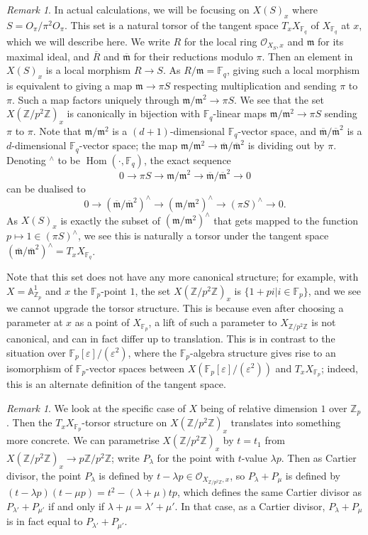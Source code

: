 \documentclass[12pt]{article}
\newcommand{\A}{\mathbb{A}}
\newcommand{\Z}{\mathbb{Z}}
\renewcommand{\O}{\mathcal{O}}
\newcommand{\F}{\mathbb{F}}
\newcommand{\m}{\mathfrak{m}}
\DeclareMathOperator{\Hom}{Hom}
\theoremstyle{plain}
\theoremstyle{definition}
\theoremstyle{remark}
\newtheorem{rem}[thm]{Remark} %
\begin{document}
\begin{rem}
\label{rem:torsortangentspace}
In actual calculations, we will be focusing on $X(S)_x$ where $S = O_\pi/\pi^2 O_\pi$. This set is a natural torsor of the tangent space $T_x X_{\F_q}$ of $X_{\F_q}$ at $x$, which we will describe here. We write $R$ for the local ring $\O_{X_{S},x}$ and $\m$ for its maximal ideal, and $\overline{R}$ and $\overline{\m}$ for their reductions modulo $\pi$. Then an element in $X(S)_x$ is a local morphism $R \to S$. As $R/\m = \F_q$, giving such a local morphism is equivalent to giving a map $\m \to \pi S$ respecting multiplication and sending $\pi$ to $\pi$. Such a map factors uniquely through $\m/\m^2 \to \pi S$. We see that the set $X(\Z/p^2\Z)_x$ is canonically in bijection with $\F_q$-linear maps $\m/\m^2 \to \pi S$ sending $\pi$ to $\pi$. Note that $\m/\m^2$ is a $(d+1)$-dimensional $\F_q$-vector space, and $\overline{\m}/\overline{\m}^2$ is a $d$-dimensional $\F_q$-vector space; the map $\m/\m^2 \to \overline{\m}/\overline{\m}^2$ is dividing out by $\pi$. Denoting ${}^\wedge$ to be $\Hom(\cdot,\F_q)$, the exact sequence
\[
0 \to \pi S \to \m/\m^2 \to \overline{\m}/\overline{\m}^2 \to 0
\]
can be dualised to
\[
0 \to (\overline{\m}/\overline{\m}^2)^\wedge \to (\m/\m^2)^\wedge \to (\pi S)^{\wedge} \to 0.
\]
As $X(S)_x$ is exactly the subset of $(\m/\m^2)^\wedge$ that gets mapped to the function $p \mapsto 1 \in (\pi S)^{\wedge}$, we see this is naturally a torsor under the tangent space $(\overline{\m}/\overline{\m}^2)^\wedge = T_{x} X_{\F_q}$.

Note that this set does not have any more canonical structure; for example, with $X = \A^1_{\Z_p}$ and $x$ the $\F_p$-point $1$, the set $X(\Z/p^2\Z)_x$ is $\{1 + pi | i \in \F_p\}$, and we see we cannot upgrade the torsor structure. This is because even after choosing a parameter at $x$ as a point of $X_{\F_p}$, a lift of such a parameter to $X_{\Z/p^2\Z}$ is not canonical, and can in fact differ up to translation. This is in contrast to the situation over $\F_p[\varepsilon]/(\varepsilon^2)$, where the $\F_p$-algebra structure gives rise to an isomorphism of $\F_p$-vector spaces between $X(\F_p[\varepsilon]/(\varepsilon^2))$ and $T_x X_{\F_p}$; indeed, this is an alternate definition of the tangent space.
\end{rem}

\begin{rem}
\label{rem:cartierlinear}
We look at the specific case of $X$ being of relative dimension $1$ over $\Z_p$. Then the $T_x X_{\F_p}$-torsor structure on $X(\Z/p^2\Z)_x$ translates into something more concrete. We can parametrise $X(\Z/p^2\Z)_x$ by $t = t_1 $ from $X(\Z/p^2\Z)_x \to p\Z/p^2\Z$; write $P_{\lambda}$ for the point with $t$-value $\lambda p$. Then as Cartier divisor, the point $P_{\lambda}$ is defined by $t - \lambda p \in \O_{X_{\Z/p^2\Z},x}$, so $P_{\lambda} + P_{\mu}$ is defined by $(t-\lambda p)(t-\mu p) = t^2 - (\lambda + \mu)tp$, which defines the same Cartier divisor as $P_{\lambda'} + P_{\mu'}$ if and only if $\lambda + \mu = \lambda' + \mu'$. In that case, as a Cartier divisor, $P_{\lambda} + P_{\mu}$ is in fact equal to $P_{\lambda'} + P_{\mu'}$.
\end{rem}
\end{document}
